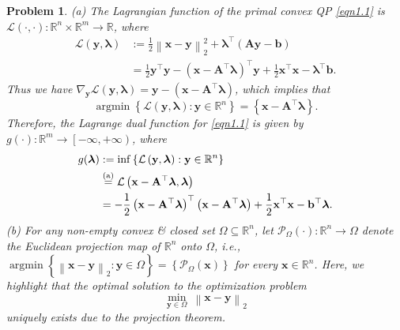 \documentclass[11pt]{article}
\newtheorem{problem}{Problem}
\DeclareMathOperator*{\argmin}{argmin}
\begin{document}
\begin{problem}
{\indent (a) The Lagrangian function of the primal convex QP \eqref{eqn1.1} is $\mathcal{L} \left( \cdot, \cdot \right) : \mathbb{R}^n \times \mathbb{R}^m \rightarrow \mathbb{R}$, where
\begin{equation*}
    \begin{split}
        \mathcal{L} \left( \mathbf{y}, \bm{\lambda} \right) &:= \frac{1}{2} \left\| \mathbf{x} - \mathbf{y} \right\|_{2}^2 + \bm{\lambda}^{\top} \left( \mathbf{Ay} - \mathbf{b} \right) \\
        &= \frac{1}{2} \mathbf{y}^{\top} \mathbf{y} - \left( \mathbf{x} - \mathbf{A}^{\top} \bm{\lambda} \right)^{\top} \mathbf{y} + \frac{1}{2} \mathbf{x}^{\top} \mathbf{x} - \bm{\lambda}^{\top} \mathbf{b}.
    \end{split}
\end{equation*}
Thus we have $\nabla_{\mathbf{y}} \mathcal{L} \left( \mathbf{y}, \bm{\lambda} \right) = \mathbf{y} - \left( \mathbf{x} - \mathbf{A}^{\top} \bm{\lambda} \right)$, which implies that
\begin{equation}
    \label{eqn1.2}
    \argmin \left\{ \mathcal{L} \left( \mathbf{y}, \bm{\lambda} \right) : \mathbf{y} \in \mathbb{R}^n \right\} = \left\{ \mathbf{x} - \mathbf{A}^{\top} \bm{\lambda} \right\}.
\end{equation}
Therefore, the Lagrange dual function for \eqref{eqn1.1} is given by $g(\cdot) : \mathbb{R}^m \rightarrow \left[ - \infty, +\infty \right)$, where
\begin{equation*}
    \begin{split}
        g (\bm{\lambda}) &:=
        \inf \left\{ \mathcal{L} \left( \mathbf{y}, \bm{\lambda} \right) : \mathbf{y} \in \mathbb{R}^n \right\} \\
        &\stackrel{\textnormal{(a)}}{=} \mathcal{L} \left( \mathbf{x} - \mathbf{A}^{\top} \bm{\lambda}, \bm{\lambda} \right) \\
        &= - \frac{1}{2} \left( \mathbf{x} - \mathbf{A}^{\top} \bm{\lambda} \right)^{\top} \left( \mathbf{x} - \mathbf{A}^{\top} \bm{\lambda} \right) + \frac{1}{2} \mathbf{x}^{\top} \mathbf{x} - \mathbf{b}^{\top} \bm{\lambda}.
    \end{split}
\end{equation*}
\indent (b) For any non-empty convex \& closed set $\Omega \subseteq \mathbb{R}^n$, let $\mathcal{P}_{\Omega} (\cdot) : \mathbb{R}^n \rightarrow \Omega$ denote the Euclidean projection map of $\mathbb{R}^n$ onto $\Omega$, \emph{i.e.}, $\argmin \left\{ \left\| \mathbf{x} - \mathbf{y} \right\|_2 : \mathbf{y} \in \Omega \right\} = \left\{ \mathcal{P}_{\Omega} (\mathbf{x}) \right\}$ for every $\mathbf{x} \in \mathbb{R}^n$. Here, we highlight that the optimal solution to the optimization problem
\begin{equation*}
    \min_{\mathbf{y} \in \Omega} \ \left\| \mathbf{x} - \mathbf{y} \right\|_2
\end{equation*}
uniquely exists due to the projection theorem. 
\medskip

}
\end{problem}
\end{document}
